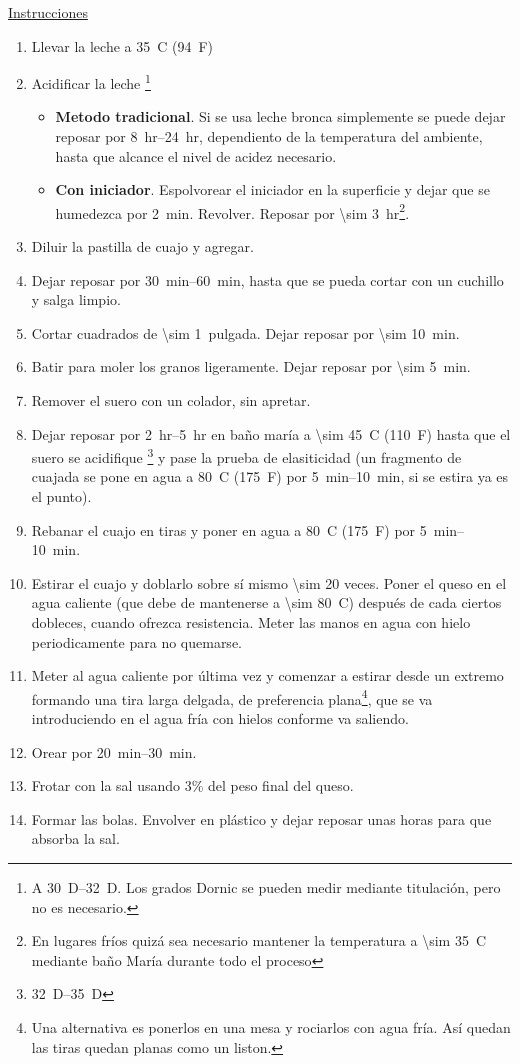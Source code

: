 \underline{Instrucciones}
\begin{enumerate}
\item Llevar la leche a \SI{35}{C} (\SI{94}{F})
\item Acidificar la leche \footnote{A \SIrange{30}{32}{D}. Los grados Dornic se pueden medir mediante titulación, pero no es necesario.} 
\begin{itemize}
\item \textbf{Metodo tradicional}. Si se usa leche bronca simplemente se puede dejar reposar por \SIrange{8}{24}{hr}, dependiento de la temperatura del ambiente, hasta que alcance el nivel de acidez necesario.
\item \textbf{Con iniciador}. Espolvorear el iniciador en la superficie y dejar que se humedezca por \SI{2}{min}. Revolver. Reposar por \SI{\sim 3}{hr}\footnote{En lugares fríos quizá sea necesario mantener la temperatura a \SI{\sim 35}{C} mediante baño María durante todo el proceso}.
\end{itemize}
\item Diluir la pastilla de cuajo y agregar.
\item Dejar reposar por \SIrange{30}{60}{min}, hasta que se pueda cortar con un cuchillo y salga limpio.
\item Cortar cuadrados de \SI{\sim 1}{pulgada}. Dejar reposar por \SI{\sim 10}{min}.
\item Batir para moler los granos ligeramente. Dejar reposar por \SI{\sim 5}{min}.
\item Remover el suero con un colador, sin apretar.
\item Dejar reposar por \SIrange{2}{5}{hr} en baño maría a \SI{\sim 45}{C} (\SI{110}{F}) hasta que el suero se acidifique \footnote{\SIrange{32}{35}{D}} y pase la prueba de elasiticidad (un fragmento de cuajada se pone en agua a \SI{80}{C} (\SI{175}{F}) por \SIrange{5}{10}{min}, si se estira ya es el punto).
\item Rebanar el cuajo en tiras y poner en agua a \SI{80}{C} (\SI{175}{F}) por  \SIrange{5}{10}{min}.
\item Estirar el cuajo y doblarlo sobre sí mismo \num{\sim 20} veces. Poner el queso en el agua caliente (que debe de mantenerse a \SI{\sim 80}{C}) después de cada ciertos dobleces, cuando ofrezca resistencia. Meter las manos en agua con hielo periodicamente para no quemarse.
\item Meter al agua caliente por última vez y comenzar a estirar desde un extremo formando una tira larga delgada, de preferencia plana\footnote{Una alternativa es ponerlos en una mesa y rociarlos con agua fría. Así quedan las tiras quedan planas como un liston.}, que se va introduciendo en el agua fría con hielos conforme va saliendo. 
\item Orear por \SIrange{20}{30}{min}.
\item Frotar con la sal usando 3\% del peso final del queso.
\item Formar las bolas. Envolver en plástico y dejar reposar unas horas para que absorba la sal.
\end{enumerate}

